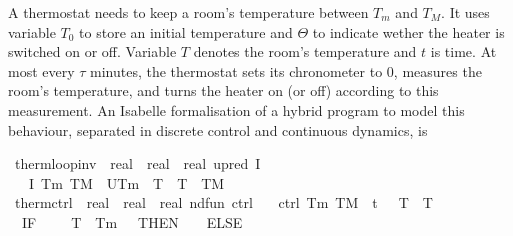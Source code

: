 \documentclass[envcountsame,envcountsect]{llncs}
\begin{document}
\begin{example}\label{ex:therm-sol}
A thermostat needs to keep a room's temperature between $T_m$ and $T_M$. It uses variable $T_0$ to store an initial temperature and $\Theta$ to indicate wether the heater is switched on or off. Variable $T$ denotes the room's temperature and $t$ is time. At most every $\tau$ minutes, the thermostat sets its chronometer to $0$, measures 
the room's temperature, and turns the heater on (or off) according to this measurement. An Isabelle formalisation of a hybrid program to model this behaviour, separated in discrete control and continuous dynamics, is

\begin{isabellebody}
\isanewline
{}\isamarkupfalse%
\ therm{\isacharunderscore}loop{\isacharunderscore}inv\ {\isacharcolon}{\isacharcolon}\ {\isachardoublequoteopen}real\ {\isasymRightarrow}\ real\ {\isasymRightarrow}\ {\isacharparenleft}real{\isacharcircum}{}{\isacharparenright}\ upred{\isachardoublequoteclose}\ {\isacharparenleft}{\isachardoublequoteopen}I{\isachardoublequoteclose}{\isacharparenright}\isanewline
\ \ \ {\isachardoublequoteopen}I\ T\isactrlsub m\ T\isactrlsub M\ {\isasymequiv}\ U{\isacharparenleft}T\isactrlsub m\ {\isasymle}\ T\ {\isasymand}\ T\ {\isasymle}\ T\isactrlsub M\ {\isasymand}\ {\isacharparenleft}{\isasymTheta}\ {\isacharequal}\ {}\ {\isasymor}\ {\isasymTheta}\ {\isacharequal}\ {}{\isacharparenright}{\isacharparenright}{\isachardoublequoteclose}\isanewline
\isanewline
{}\isamarkupfalse%
\ therm{\isacharunderscore}ctrl\ {\isacharcolon}{\isacharcolon}\ {\isachardoublequoteopen}real\ {\isasymRightarrow}\ real\ {\isasymRightarrow}\ {\isacharparenleft}real{\isacharcircum}{}{\isacharparenright}\ nd{\isacharunderscore}fun{\isachardoublequoteclose}\ {\isacharparenleft}{\isachardoublequoteopen}ctrl{\isachardoublequoteclose}{\isacharparenright}\isanewline
\ \ \ {\isachardoublequoteopen}ctrl\ T\isactrlsub m\ T\isactrlsub M\ {\isasymequiv}\ {\isacharparenleft}t\ {\isacharcolon}{\isacharcolon}{\isacharequal}\ {}{\isacharparenright}{\isacharsemicolon}\ {\isacharparenleft}T\ {\isacharcolon}{\isacharcolon}{\isacharequal}\ T{\isacharparenright}{\isacharsemicolon}\isanewline
\ \ {\isacharparenleft}IF\ {\isacharparenleft}{\isasymTheta}\ {\isacharequal}\ {}\ {\isasymand}\ T\ {\isasymle}\ T\isactrlsub m\ {\isacharplus}\ {}{\isacharparenright}\ THEN\ {\isacharparenleft}{\isasymTheta}\ {\isacharcolon}{\isacharcolon}{\isacharequal}\ {}{\isacharparenright}\ ELSE\ \isanewline

\end{isabellebody}
\end{example}
\end{document}

